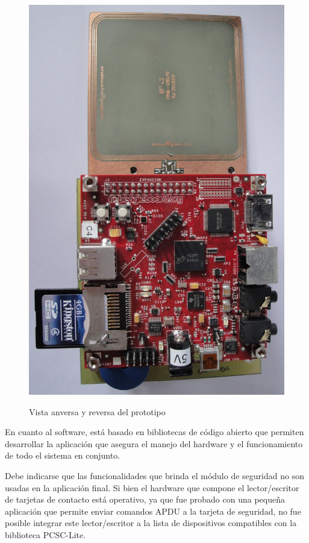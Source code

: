 \begin{figure}[H]
{  \includegraphics[scale=.13]{Imagenes/prototipo_b.jpg} }

  \caption{Vista anversa y reversa del prototipo}\label{protoFB}
\end{figure}

En cuanto al software, está basado en bibliotecas de código abierto que permiten desarrollar la aplicación que asegura el manejo del hardware y el funcionamiento de todo el sistema en conjunto.

\bigskip
Debe indicarse que las funcionalidades que brinda el módulo de seguridad no son usadas en la aplicación final. Si bien el hardware que compone el lector/escritor de tarjetas de contacto está operativo, ya que fue probado con una pequeña aplicación que permite enviar comandos APDU a la tarjeta de seguridad, no fue posible integrar este lector/escritor a la lista de dispositivos compatibles con la biblioteca PCSC-Lite.

